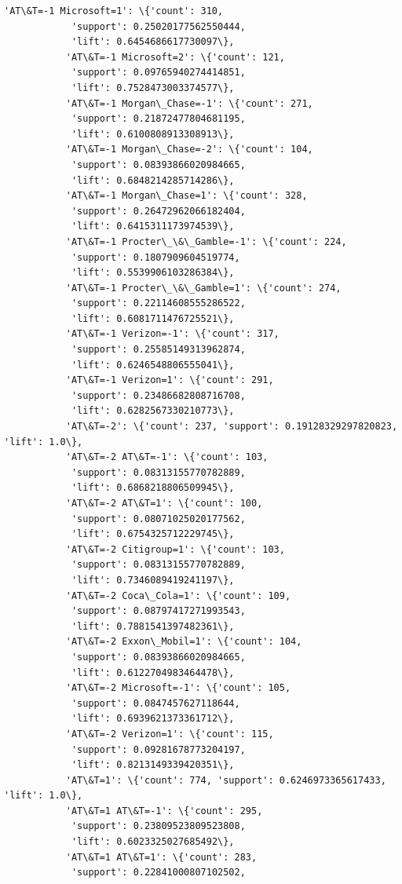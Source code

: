\documentclass[11pt]{article}
\begin{document}
\begin{Verbatim}[commandchars=\\\{\}]
           'AT\&T=-1 Microsoft=1': \{'count': 310,
            'support': 0.25020177562550444,
            'lift': 0.6454686617730097\},
           'AT\&T=-1 Microsoft=2': \{'count': 121,
            'support': 0.09765940274414851,
            'lift': 0.7528473003374577\},
           'AT\&T=-1 Morgan\_Chase=-1': \{'count': 271,
            'support': 0.21872477804681195,
            'lift': 0.6100808913308913\},
           'AT\&T=-1 Morgan\_Chase=-2': \{'count': 104,
            'support': 0.08393866020984665,
            'lift': 0.6848214285714286\},
           'AT\&T=-1 Morgan\_Chase=1': \{'count': 328,
            'support': 0.26472962066182404,
            'lift': 0.6415311173974539\},
           'AT\&T=-1 Procter\_\&\_Gamble=-1': \{'count': 224,
            'support': 0.1807909604519774,
            'lift': 0.5539906103286384\},
           'AT\&T=-1 Procter\_\&\_Gamble=1': \{'count': 274,
            'support': 0.22114608555286522,
            'lift': 0.6081711476725521\},
           'AT\&T=-1 Verizon=-1': \{'count': 317,
            'support': 0.25585149313962874,
            'lift': 0.6246548806555041\},
           'AT\&T=-1 Verizon=1': \{'count': 291,
            'support': 0.23486682808716708,
            'lift': 0.6282567330210773\},
           'AT\&T=-2': \{'count': 237, 'support': 0.19128329297820823, 'lift': 1.0\},
           'AT\&T=-2 AT\&T=-1': \{'count': 103,
            'support': 0.08313155770782889,
            'lift': 0.6868218806509945\},
           'AT\&T=-2 AT\&T=1': \{'count': 100,
            'support': 0.08071025020177562,
            'lift': 0.6754325712229745\},
           'AT\&T=-2 Citigroup=1': \{'count': 103,
            'support': 0.08313155770782889,
            'lift': 0.7346089419241197\},
           'AT\&T=-2 Coca\_Cola=1': \{'count': 109,
            'support': 0.08797417271993543,
            'lift': 0.7881541397482361\},
           'AT\&T=-2 Exxon\_Mobil=1': \{'count': 104,
            'support': 0.08393866020984665,
            'lift': 0.6122704983464478\},
           'AT\&T=-2 Microsoft=-1': \{'count': 105,
            'support': 0.0847457627118644,
            'lift': 0.6939621373361712\},
           'AT\&T=-2 Verizon=1': \{'count': 115,
            'support': 0.09281678773204197,
            'lift': 0.8213149339420351\},
           'AT\&T=1': \{'count': 774, 'support': 0.6246973365617433, 'lift': 1.0\},
           'AT\&T=1 AT\&T=-1': \{'count': 295,
            'support': 0.23809523809523808,
            'lift': 0.6023325027685492\},
           'AT\&T=1 AT\&T=1': \{'count': 283,
            'support': 0.22841000807102502,

\end{Verbatim}
\end{document}
